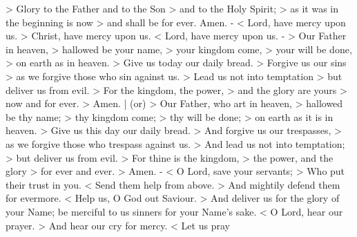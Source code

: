 \documentclass{liturgy}
\begin{document}
\vgap

\begin{responses}
  > Glory to the Father and to the Son
  > and to the Holy Spirit;
  > as it was in the beginning is now
  > and shall be for ever. Amen.
  -
  < Lord, have mercy upon us.
  > Christ, have mercy upon us.
  < Lord, have mercy upon us.
  -
  > Our Father in heaven,
  > hallowed be your name,
  > your kingdom come,
  > your will be done,
  > on earth as in heaven.
  > Give us today our daily bread.
  > Forgive us our sins
  > as we forgive those who sin against us.
  > Lead us not into temptation
  > but deliver us from evil.
  > For the kingdom, the power,
  > and the glory are yours
  > now and for ever.
  > Amen.
  | (or)
  > Our Father, who art in heaven,
  > hallowed be thy name;
  > thy kingdom come;
  > thy will be done;
  > on earth as it is in heaven.
  > Give us this day our daily bread.
  > And forgive us our trespasses,
  > as we forgive those who trespass against us.
  > And lead us not into temptation;
  > but deliver us from evil.
  > For thine is the kingdom,
  > the power, and the glory
  > for ever and ever.
  > Amen.
  -
  < O Lord, save your servants;
  > Who put their trust in you.
  < Send them help from above.
  > And mightily defend them for evermore.
  < Help us, O God out Saviour.
  > And deliver us for the glory of your Name; be merciful to us sinners for your Name's sake.
  < O Lord, hear our prayer.
  > And hear our cry for mercy.
  < Let us pray
\end{responses}
\end{document}
